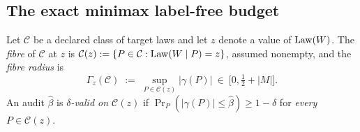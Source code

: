 %

\subsection{The exact minimax label-free budget}

\begin{definition}\label{def:fibre-radius}
Let $\mathcal C$ be a declared class of target laws and let $z$ denote a value of
$\mathrm{Law}(W)$. The \emph{fibre} of $\mathcal C$ at $z$ is
$\mathcal C(z):=\{P\in\mathcal C:\mathrm{Law}(W\mid P)=z\}$, assumed nonempty, and the \emph{fibre
radius} is
\[
\Gamma_z(\mathcal C)\;:=\;\sup_{P\in\mathcal C(z)}|\gamma(P)|\ \in\ \bigl[0,\tfrac12+|M|\bigr].
\]
An audit $\widehat\beta$ is \emph{$\delta$-valid on $\mathcal C(z)$} if
$\Pr_P(|\gamma(P)|\le\widehat\beta)\ge1-\delta$ for \emph{every} $P\in\mathcal C(z)$.
\end{definition}

